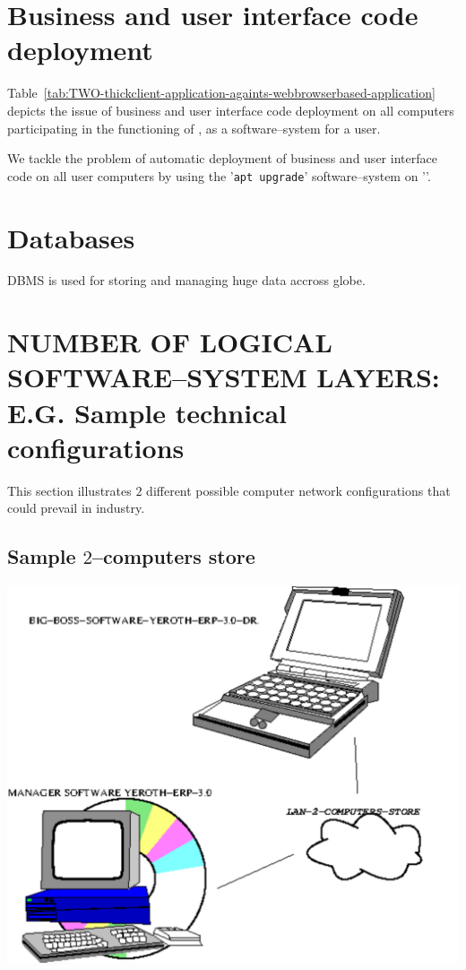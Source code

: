 \vspace{1em}

\section{Business and user interface code deployment}

Table~\ref{tab:TWO-thickclient-application-againts-webbrowserbased-application}
depicts the issue of business and user
interface code deployment on all computers
participating in the functioning of \yerotherpblack,
as a software--system for a user.

We tackle the problem of automatic deployment of
business and user interface code on all user
computers by using the '\texttt{apt upgrade}'
software--system on '\debianlinux'.


\section{Databases}

DBMS \MySQL is used for storing and managing huge
data accross globe.

\section{NUMBER OF LOGICAL SOFTWARE--SYSTEM LAYERS: E.G. Sample technical configurations}

This section illustrates $2$ different possible
computer network configurations that
could prevail in industry. 

\newpage

\subsection{Sample $2$--computers store}

\begin{center}
\includegraphics[scale=0.7]{images/yeroth-erp-sample-2-computers-store.pdf}
\label{fig:sample-two-computers-store}
\end{center}

